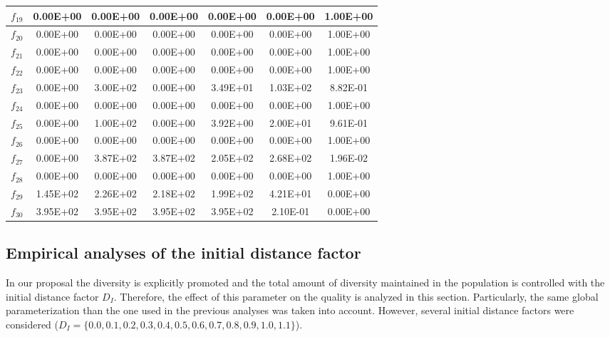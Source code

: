 \begin{table}[t]
\begin{scriptsize}
\begin{tabular}{|c|c|c|c|c|c|c|}
$f_{19}$ & 0.00E+00 & 0.00E+00 & 0.00E+00 & 0.00E+00 & 0.00E+00 & 1.00E+00 \\ \hline
$f_{20}$ & 0.00E+00 & 0.00E+00 & 0.00E+00 & 0.00E+00 & 0.00E+00 & 1.00E+00 \\ \hline
$f_{21}$ & 0.00E+00 & 0.00E+00 & 0.00E+00 & 0.00E+00 & 0.00E+00 & 1.00E+00 \\ \hline
$f_{22}$ & 0.00E+00 & 0.00E+00 & 0.00E+00 & 0.00E+00 & 0.00E+00 & 1.00E+00 \\ \hline
$f_{23}$ & 0.00E+00 & 3.00E+02 & 0.00E+00 & 3.49E+01 & 1.03E+02 & 8.82E-01 \\ \hline
$f_{24}$ & 0.00E+00 & 0.00E+00 & 0.00E+00 & 0.00E+00 & 0.00E+00 & 1.00E+00 \\ \hline
$f_{25}$ & 0.00E+00 & 1.00E+02 & 0.00E+00 & 3.92E+00 & 2.00E+01 & 9.61E-01 \\ \hline
$f_{26}$ & 0.00E+00 & 0.00E+00 & 0.00E+00 & 0.00E+00 & 0.00E+00 & 1.00E+00 \\ \hline
$f_{27}$ & 0.00E+00 & 3.87E+02 & 3.87E+02 & 2.05E+02 & 2.68E+02 & 1.96E-02 \\ \hline
$f_{28}$ & 0.00E+00 & 0.00E+00 & 0.00E+00 & 0.00E+00 & 0.00E+00 & 1.00E+00 \\ \hline
$f_{29}$ & 1.45E+02 & 2.26E+02 & 2.18E+02 & 1.99E+02 & 4.21E+01 & 0.00E+00 \\ \hline
$f_{30}$ & 3.95E+02 & 3.95E+02 & 3.95E+02 & 3.95E+02 & 2.10E-01 & 0.00E+00 \\ \hline
\end{tabular}%
\end{scriptsize}
\end{table}

\subsection{Empirical analyses of the initial distance factor}

In our proposal the diversity is explicitly promoted and the total amount of diversity maintained in the population 
is controlled with the initial distance factor $D_I$.
%
Therefore, the effect of this parameter on the quality is analyzed in this section.
%
Particularly, the same global parameterization than the one used in the previous analyses was taken into account.
%
However, several initial distance factors were considered ($D_I = \{0.0, 0.1, 0.2, 0.3, 0.4, 0.5, 0.6, 0.7, 0.8, 0.9, 1.0, 1.1 \}$).

